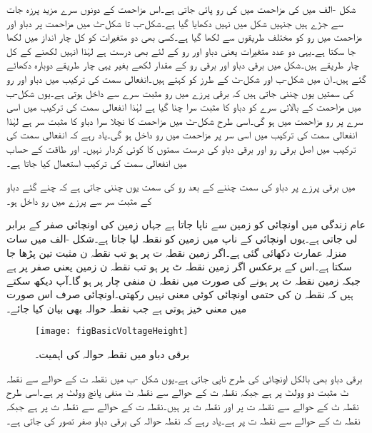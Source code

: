 شکل -الف میں  کی مزاحمت میں  کی رو پائی جاتی ہے۔اس مزاحمت کے دونوں سرے مزید پرزہ جات سے جڑے ہیں جنہیں شکل میں نہیں دکھایا گیا ہے۔شکل-ب تا شکل-ٹ میں مزاحمت پر دباو اور مزاحمت میں رو کو مختلف طریقوں سے لکھا گیا ہے۔کسی بھی دو متغیرات کو کل چار انداز میں لکھا جا سکتا ہے۔یہی دو عدد متغیرات یعنی دباو اور رو کے لئے بھی درست ہے لہٰذا انہیں لکھنے کے کل چار طریقے ہیں۔شکل  میں برقی دباو اور برقی رو کے مقدار لکھے بغیر یہی چار طریقے دوبارہ دکھائے گئے ہیں۔ان میں شکل-ب اور شکل-ٹ کے طرز کو  کہتے ہیں۔انفعالی سمت کی ترکیب میں دباو  اور رو  کی سمتیں یوں چننی جاتی ہیں کہ برقی پرزے میں رو مثبت سرے سے داخل ہوتی ہے۔یوں شکل-ب میں مزاحمت کے بالائی سرے کو دباو کا مثبت سرا چنا گیا ہے لہٰذا انفعالی سمت کی ترکیب میں اسی سرے پر رو مزاحمت میں ہو گی۔اسی طرح شکل-ٹ میں مزاحمت کا نچلا سرا دباو کا مثبت سر ہے لہٰذا انفعالی سمت کی ترکیب میں اسی سر پر مزاحمت میں رو داخل ہو گی۔یاد رہے کہ انفعالی سمت کی ترکیب میں اصل برقی رو اور برقی دباو کی درست سمتوں کا کوئی کردار نہیں۔ اور طاقت کے حساب میں انفعالی سمت کی ترکیب استعمال کیا جاتا ہے۔

 میں برقی پرزے پر دباو کی سمت چننے کے بعد رو کی سمت یوں چننی جاتی ہے کہ چنے گئے دباو کے مثبت سر سے پرزے میں  رو داخل ہو۔

عام زندگی میں اونچائی کو زمین سے ناپا جاتا ہے جہاں زمین کی اونچائی صفر کے برابر لی جاتی ہے۔یوں اونچائی کے ناپ میں زمین کو نقطہ  لیا جاتا ہے۔شکل -الف میں سات منزلہ عمارت دکھائی گئی ہے۔اگر زمین نقطہ ت پر ہو تب نقطہ ن مثبت تین پڑھا جا سکتا ہے۔اس کے برعکس اگر زمین نقطہ ٹ پر ہو تب نقطہ ن زمین یعنی صفر پر ہے جبکہ زمین نقطہ ث پر ہونے کی صورت میں نقطہ ن منفی چار پر ہو گا۔آپ دیکھ سکتے ہیں کہ نقطہ ن کی حتمی اونچائی کوئی معنی نہیں رکھتی۔اونچائی صرف اس صورت میں معنی خیز ہوتی ہے جب نقطہ حوالہ بھی بیان کیا جائے۔
\begin{figure}
\centering
\texttt{[image: figBasicVoltageHeight]}
\caption{برقی دباو میں نقطہ حوالہ کی اہمیت۔}
\label{شکل_بنیادی_دباو_اور_اونچائی}
\end{figure}
برقی دباو بھی بالکل اونچائی کی طرح ناپی جاتی ہے۔یوں شکل -ب میں نقطہ ت کے حوالے سے نقطہ ٹ مثبت دو وولٹ  پر ہے جبکہ نقطہ ث کے حوالے سے نقطہ ٹ منفی پانچ وولٹ  پر ہے۔اسی طرح نقطہ ٹ کے حوالے سے نقطہ ت  پر اور نقطہ ث  پر ہیں۔نقطہ ت کے حوالے سے نقطہ ث  پر ہے جبکہ نقطہ ث کے حوالے سے نقطہ ت  پر ہے۔یاد رہے کہ نقطہ حوالہ کی برقی دباو صفر تصور کی جاتی ہے۔

